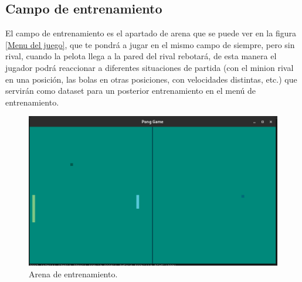 \subsection{Campo de entrenamiento}
El campo de entrenamiento es el apartado de arena que se puede ver en la figura \ref{Menu del juego}, que te pondrá a jugar en el mismo campo de siempre, pero sin rival, cuando la pelota llega a la pared del rival rebotará, de esta manera el jugador podrá reaccionar a diferentes situaciones de partida (con el minion rival en una posición, las bolas en otras posiciones, con velocidades distintas, etc.) que servirán como dataset para un posterior entrenamiento en el menú de entrenamiento.
\begin{figure}[H]
	\centering
	\includegraphics[width=15cm]{archivos/imagenes/arena-de-entrenamiento.png}
	\caption{Arena de entrenamiento.}
\end{figure}


